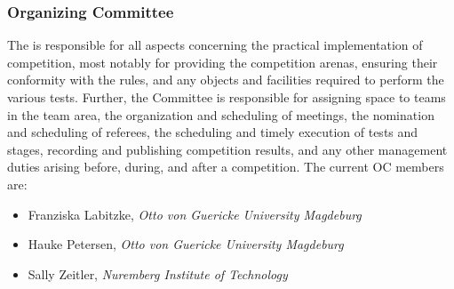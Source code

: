 \subsubsection{Organizing Committee}
The  is responsible for all aspects concerning the practical implementation of competition, most notably for providing the competition arenas, ensuring their conformity with the rules, and any objects and facilities required to perform the various tests. Further, the Committee is responsible for assigning space to teams in the team area, the organization and scheduling of meetings, the nomination and scheduling of referees, the scheduling and timely execution of tests and stages, recording and publishing competition results, and any other management duties arising before, during, and after a competition. The current OC members are:

\begin{itemize}
	\item Franziska Labitzke, \textit{Otto von Guericke University Magdeburg}
	\item Hauke Petersen, \textit{Otto von Guericke University Magdeburg} 
	\item Sally Zeitler, \textit{Nuremberg Institute of Technology}
\end{itemize}











